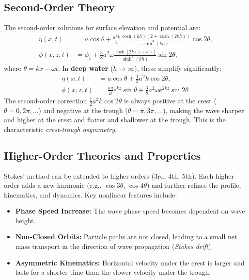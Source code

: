 \documentclass[11pt,letterpaper]{article}
\begin{document}
    \subsection{Second-Order Theory}
    The second-order solutions for surface elevation and potential are:
    \begin{align}
        \eta(x,t) &= a \cos\theta + \frac{a^2 k}{4} \frac{\cosh(kh)(2 + \cosh(2kh))}{\sinh^3(kh)} \cos 2\theta, \\
        \phi(x,z,t) &= \phi_1 + \frac{3}{8} a^2 \omega \frac{\cosh[2k(z+h)]}{\sinh^4(kh)} \sin 2\theta,
    \end{align}
    where $\theta = kx - \omega t$. In \textbf{deep water} ($h \to \infty$), these simplify significantly:
    \begin{align}
        \eta(x,t) &= a \cos\theta + \frac{1}{2} a^2 k \cos 2\theta, \\
        \phi(x,z,t) &= \frac{a g}{\omega} e^{kz} \sin\theta + \frac{3}{8} a^2 \omega e^{2kz} \sin 2\theta.
    \end{align}
    The second-order correction $\frac{1}{2} a^2 k \cos 2\theta$ is always positive at the crest ($\theta=0, 2\pi, \dots$) and negative at the trough ($\theta=\pi, 3\pi, \dots$), making the wave sharper and higher at the crest and flatter and shallower at the trough. This is the characteristic \emph{crest-trough asymmetry}.

    \subsection{Higher-Order Theories and Properties}
    Stokes' method can be extended to higher orders (3rd, 4th, 5th). Each higher order adds a new harmonic (e.g., $\cos 3\theta$, $\cos 4\theta$) and further refines the profile, kinematics, and dynamics. Key nonlinear features include:
    \begin{itemize}
        \item \textbf{Phase Speed Increase:} The wave phase speed becomes dependent on wave height.
        \item \textbf{Non-Closed Orbits:} Particle paths are not closed, leading to a small net mass transport in the direction of wave propagation (\emph{Stokes drift}).
        \item \textbf{Asymmetric Kinematics:} Horizontal velocity under the crest is larger and lasts for a shorter time than the slower velocity under the trough.
    \end{itemize}
\end{document}
